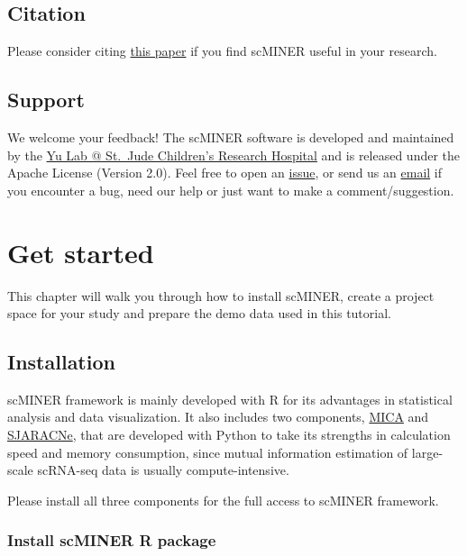 \documentclass[
  12pt,
]{book}
\begin{document}
\section{Citation}\label{citation}

Please consider citing \href{https://www.biorxiv.org/content/10.1101/2023.01.26.523391v1}{this paper} if you find scMINER useful in your research.

\section{Support}\label{support}

We welcome your feedback! The scMINER software is developed and maintained by the \href{https://www.stjude.org/research/labs/yu-lab.html}{Yu Lab @ St.~Jude Children's Research Hospital} and is released under the Apache License (Version 2.0). Feel free to open an \href{https://github.com/jyyulab/scMINER/issues}{issue}, or send us an \href{mailto:jiyang.yu@stjude.org}{email} if you encounter a bug, need our help or just want to make a comment/suggestion.

\chapter{Get started}\label{get-started}

This chapter will walk you through how to install scMINER, create a project space for your study and prepare the demo data used in this tutorial.

\section{Installation}\label{installation}

scMINER framework is mainly developed with R for its advantages in statistical analysis and data visualization. It also includes two components, \href{https://github.com/jyyulab/MICA}{MICA} and \href{https://github.com/jyyulab/SJARACNe}{SJARACNe}, that are developed with Python to take its strengths in calculation speed and memory consumption, since mutual information estimation of large-scale scRNA-seq data is usually compute-intensive.

Please install all three components for the full access to scMINER framework.

\subsection*{Install scMINER R package}\label{install-scminer-r-package}
\end{document}
